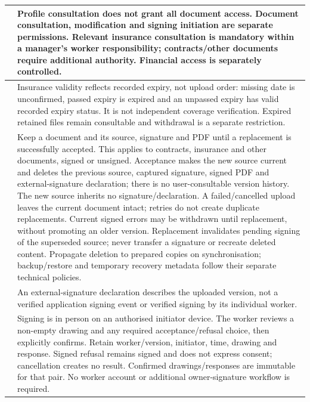 {\begin{longtable}{L{0.12}L{0.88}}
\midrule
{}\label{br:024}\textbf{} & Profile consultation does not grant all document access. Document consultation, modification and signing initiation are separate permissions. Relevant insurance consultation is mandatory within a manager's worker responsibility; contracts/other documents require additional authority. Financial access is separately controlled. \\
\midrule
{}\label{br:025}\textbf{} & Insurance validity reflects recorded expiry, not upload order: missing date is unconfirmed, passed expiry is expired and an unpassed expiry has valid recorded expiry status. It is not independent coverage verification. Expired retained files remain consultable and withdrawal is a separate restriction. \\
\midrule
{}\label{br:026}\textbf{} & Keep a document and its source, signature and PDF until a replacement is successfully accepted. This applies to contracts, insurance and other documents, signed or unsigned. Acceptance makes the new source current and deletes the previous source, captured signature, signed PDF and external-signature declaration; there is no user-consultable version history. The new source inherits no signature/declaration. A failed/cancelled upload leaves the current document intact; retries do not create duplicate replacements. Current signed errors may be withdrawn until replacement, without promoting an older version. Replacement invalidates pending signing of the superseded source; never transfer a signature or recreate deleted content. Propagate deletion to prepared copies on synchronisation; backup/restore and temporary recovery metadata follow their separate technical policies. \\
\midrule
{}\label{br:027}\textbf{} & An external-signature declaration describes the uploaded version, not a verified application signing event or verified signing by its individual worker. \\
\midrule
{}\label{br:028}\textbf{} & Signing is in person on an authorised initiator device. The worker reviews a non-empty drawing and any required acceptance/refusal choice, then explicitly confirms. Retain worker/version, initiator, time, drawing and response. Signed refusal remains signed and does not express consent; cancellation creates no result. Confirmed drawings/responses are immutable for that pair. No worker account or additional owner-signature workflow is required. \\

\end{longtable}}
